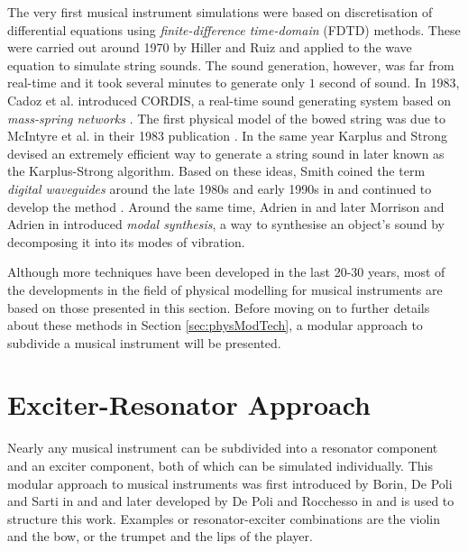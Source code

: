 The very first musical instrument simulations were based on discretisation of differential equations using \textit{finite-difference time-domain} (FDTD) methods. These were carried out around 1970 by Hiller and Ruiz \cite{Ruiz1969, Hiller1971I, Hiller1971II} and applied to the wave equation to simulate string sounds. The sound generation, however, was far from real-time and it took several minutes to generate only $1$ second of sound. In 1983, Cadoz et al. introduced CORDIS, a real-time sound generating system based on \textit{mass-spring networks} \cite{Cadoz1983}.
The first physical model of the bowed string was due to McIntyre et al. in their 1983 publication \cite{McIntyre1983}. In the same year Karplus and Strong devised an extremely efficient way to generate a string sound in \cite{Karplus1983} later known as the Karplus-Strong algorithm. Based on these ideas, Smith coined the term \textit{digital waveguides} around the late 1980s and early 1990s in \cite{Smith1987, Smith1992} and continued to develop the method \cite{Smith2010b}.
Around the same time, Adrien in \cite{Adrien1991} and later Morrison and Adrien in \cite{Morrison1993} introduced \textit{modal synthesis}, a way to synthesise an object's sound by decomposing it into its modes of vibration. 

Although more techniques have been developed in the last 20-30 years, most of the developments in the field of physical modelling for musical instruments are based on those presented in this section. Before moving on to further details about these methods in Section \ref{sec:physModTech}, a modular approach to subdivide a musical instrument will be presented.

\section{Exciter-Resonator Approach}\label{sec:exciterResonator}
Nearly any musical instrument can be subdivided into a resonator component and an exciter component, both of which can be simulated individually. This modular approach to musical instruments was first introduced by Borin, De Poli and Sarti in \cite{Borin1989} and and later developed by De Poli and Rocchesso in \cite{Poli1998} and is used to structure this work. Examples or resonator-exciter combinations are the violin and the bow, or the trumpet and the lips of the player. %

